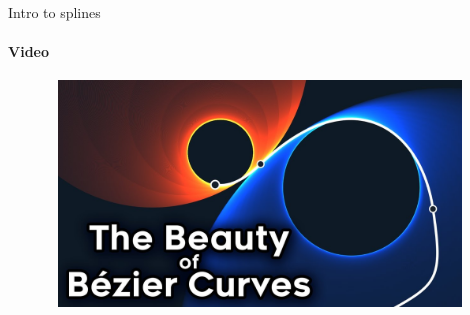 \documentclass[aspectratio=169]{beamer}
\begin{document}
\begin{frame}[t]{Intro to splines}
    \framesubtitle{Video}
    \vspace{-0.6cm}
    \begin{figure}[H]
        \href{https://youtu.be/aVwxzDHniEw}{
            \centering\includegraphics[height=6cm,width=1\textwidth,keepaspectratio]{beauty_of_bezier_video.jpg}}
        \label{fig:beauty_of_bezier_video.jpg}
    \end{figure}
\end{frame}
\end{document}
